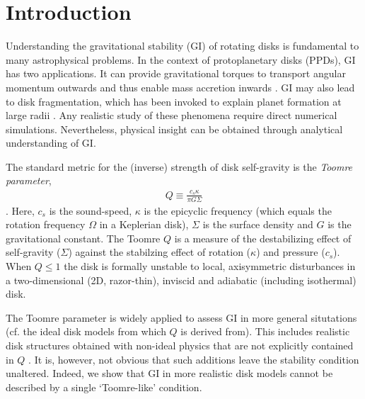\documentclass[iop, numberedappendix]{emulateapj}
\begin{document}
\section{Introduction}\label{intro}
Understanding the gravitational stability (GI) of rotating disks   
is fundamental to many astrophysical problems. In the context of 
protoplanetary disks (PPDs), GI has two applications. It can 
provide gravitational torques to transport angular momentum outwards
and thus enable mass accretion inwards \citep{armitage10,turner14}.   
GI may also lead to disk fragmentation, which has been invoked to explain planet formation at
large radii \citep{helled14}. Any realistic study of these phenomena require direct
numerical simulations. Nevertheless, physical insight can be  
obtained through analytical understanding of GI.  %

The standard metric for the (inverse) strength of disk self-gravity is the 
\emph{Toomre parameter}, 
\begin{align}\label{toomreQ_criterion}
  Q \equiv \frac{c_s\kappa}{\pi G \Sigma}  
\end{align}
\citep{toomre64}. Here, $c_s$ is the sound-speed,
$\kappa$ is the epicyclic frequency (which equals the rotation
frequency $\Omega$ in a Keplerian disk), $\Sigma$ is the surface
density and $G$ is the gravitational constant. The Toomre $Q$ is a
measure of the destabilizing effect of self-gravity ($\Sigma$) against 
the stabilzing effect of rotation ($\kappa$) and pressure
($c_s$). When $Q\leq 1$ the disk is formally unstable to local,
axisymmetric disturbances in a two-dimensional (2D, razor-thin),
inviscid and adiabatic (including isothermal) disk.  


The Toomre  parameter is widely applied to assess GI in more general 
situtations (cf. the ideal disk models from which $Q$ is derived
from).  This includes realistic disk structures
obtained with non-ideal physics that are not explicitly contained in
$Q$ \citep[e.g.][]{kimura12}.  It is, however, not obvious that such additions
leave the stability condition unaltered. Indeed, we show that GI in more
realistic disk models cannot be described by a single `Toomre-like' 
condition.   

\end{document}
